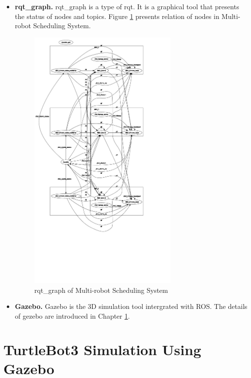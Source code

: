\begin{itemize}
    \item \textbf{rqt\_graph.} rqt\_graph is a type of rqt. It is a graphical tool that presents the status of nodes and topics. Figure \ref{fig:rqt_graph} presents relation of nodes in Multi-robot Scheduling System.
    \begin{figure}[htbp]
        \centering
        \includegraphics[width = 0.7\textwidth]{content/images/ch2/rosgraph.png}
        \caption{rqt\_graph of Multi-robot Scheduling System}
        \label{fig:rqt_graph}
    \end{figure}

    \item \textbf{Gazebo.} Gazebo \cite{GZ} is the 3D simulation tool intergrated with ROS. The details of gezebo are introduced in Chapter \ref{sec:modeling_gazebo}.
\end{itemize}

\section{TurtleBot3 Simulation Using Gazebo}
\label{sec:modeling_gazebo}

